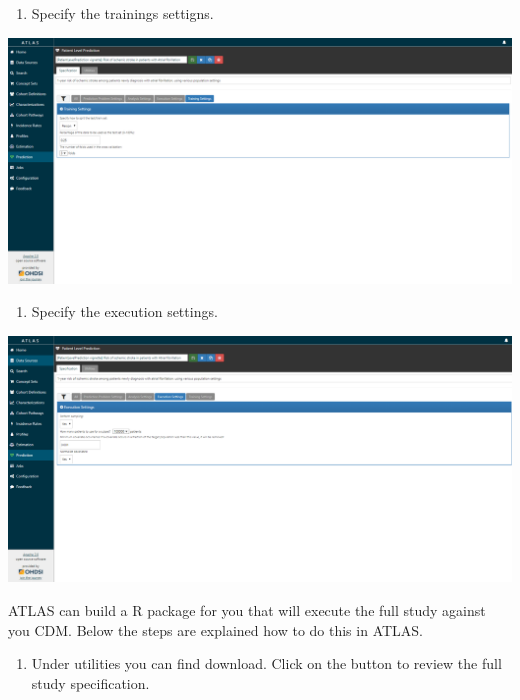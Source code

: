 \documentclass[]{book}
\providecommand{\tightlist}{%
  \setlength{\itemsep}{0pt}\setlength{\parskip}{0pt}}
\begin{document}
\newpage

\begin{enumerate}
\def\labelenumi{\arabic{enumi}.}
\setcounter{enumi}{2}
\tightlist
\item
  Specify the trainings settigns.
\end{enumerate}

\includegraphics{images/PatientLevelPrediction/atlasplp3.png}

\begin{enumerate}
\def\labelenumi{\arabic{enumi}.}
\setcounter{enumi}{3}
\tightlist
\item
  Specify the execution settings.
\end{enumerate}

\includegraphics{images/PatientLevelPrediction/atlasplp4.png}

\newpage

ATLAS can build a R package for you that will execute the full study
against you CDM. Below the steps are explained how to do this in ATLAS.

\begin{enumerate}
\def\labelenumi{\arabic{enumi}.}
\tightlist
\item
  Under utilities you can find download. Click on the button to review
  the full study specification.
\end{enumerate}
\end{document}
